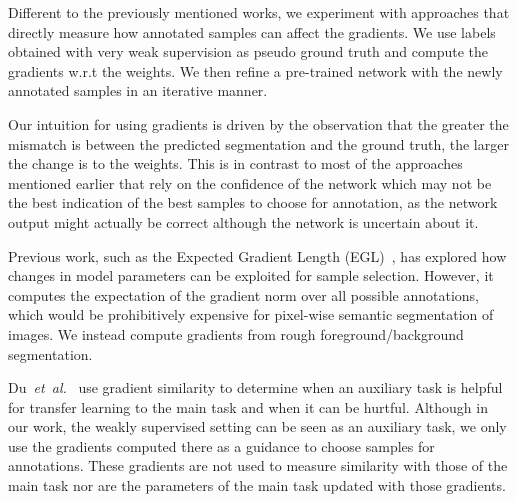 \documentclass[letterpaper, 10 pt, conference]{ieeeconf}  %
\newcommand\etal{\emph{et~al.}}
\begin{document}
Different to the previously mentioned works, we experiment with approaches that directly measure how annotated samples can affect the gradients. We use labels obtained with very weak supervision as pseudo ground truth and compute the gradients w.r.t the weights. We then refine a pre-trained network with the newly annotated samples in an iterative manner. 

Our intuition for using gradients is driven by the observation that the greater the mismatch is between the predicted segmentation and the ground truth, the larger the change is to the weights. This is in contrast to most of the approaches mentioned earlier that rely on the confidence of the network which may not be the best indication of the best samples to choose for annotation, as the network output might actually be correct although the network is uncertain about it.

Previous work, such as the Expected Gradient Length (EGL)~\cite{huang2016active, settles2008multiple}, has explored how changes in model parameters can be exploited for sample selection. However, it computes the expectation of the gradient norm over all possible annotations, which would be prohibitively expensive for pixel-wise semantic segmentation of images. We instead compute gradients from rough foreground/background segmentation.

Du~\etal~\cite{du2018adapting} use gradient similarity to determine when an auxiliary task is helpful for transfer learning to the main task and when it can be hurtful. Although in our work, the weakly supervised setting can be seen as an auxiliary task, we only use the gradients computed there as a guidance to choose samples for annotations. These gradients are not used to measure similarity with those of the main task nor are the parameters of the main task updated with those gradients. 
\end{document}

